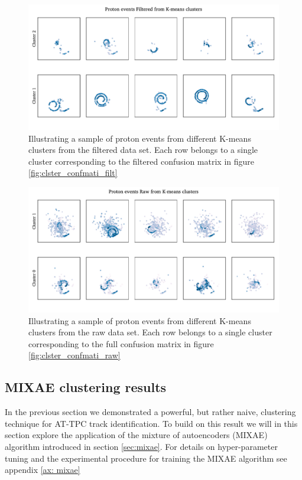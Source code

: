\documentclass[review,number,sort&compress]{elsarticle}
\begin{document}
\begin{figure}
\includegraphics[width=\textwidth]{custom_work/Filteredexamples.pdf}
\caption[Filtered proton samples by cluster belonging]{Illustrating a sample of proton events from different K-means clusters from the filtered data set. Each row belongs to a single cluster corresponding to the filtered confusion matrix in figure \ref{fig:clster_confmati_filt}}\label{fig:filtered_vgg_clster_repr}
\end{figure} 

\begin{figure}
\includegraphics[width=\textwidth]{custom_work/Rawexamples.pdf}
\caption[Full proton samples by cluster belonging]{Illustrating a sample of proton events from different K-means clusters from the raw data set. Each row belongs to a single cluster corresponding to the full confusion matrix in figure \ref{fig:clster_confmati_raw}}\label{fig:full_vgg_clster_repr}
\end{figure} 


\subsection{MIXAE clustering results}

In the previous section we demonstrated a powerful, but rather naive, clustering technique for AT-TPC track identification. To build on this result we will in this section explore the application of the mixture of autoencoders (MIXAE) algorithm introduced in section \ref{sec:mixae}.
For details on hyper-parameter tuning and the experimental procedure for training the MIXAE algorithm see appendix \ref{ax: mixae}
\end{document}
